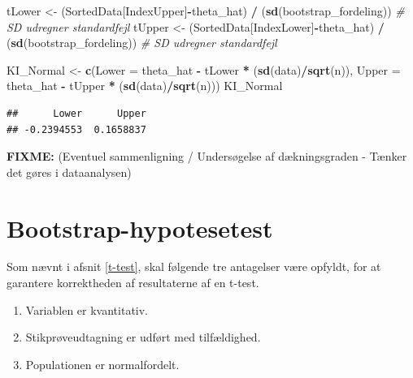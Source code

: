 \documentclass[
]{book}
\newenvironment{Shaded}{\begin{snugshade}}{\end{snugshade}}
\newcommand{\CommentTok}[1]{\textcolor[rgb]{0.56,0.35,0.01}{\textit{#1}}}
\newcommand{\DataTypeTok}[1]{\textcolor[rgb]{0.13,0.29,0.53}{#1}}
\newcommand{\KeywordTok}[1]{\textcolor[rgb]{0.13,0.29,0.53}{\textbf{#1}}}
\newcommand{\NormalTok}[1]{#1}
\newcommand{\OperatorTok}[1]{\textcolor[rgb]{0.81,0.36,0.00}{\textbf{#1}}}
\newcommand{\StringTok}[1]{\textcolor[rgb]{0.31,0.60,0.02}{#1}}
\providecommand{\tightlist}{%
  \setlength{\itemsep}{0pt}\setlength{\parskip}{0pt}}
\theoremstyle{definition}
\theoremstyle{definition}
\theoremstyle{definition}
\theoremstyle{remark}
\begin{document}
\begin{Shaded}
\begin{Highlighting}[]
\NormalTok{tLower <-}\StringTok{ }\NormalTok{(SortedData[IndexUpper]}\OperatorTok{-}\NormalTok{theta_hat) }\OperatorTok{/}
\StringTok{  }\NormalTok{(}\KeywordTok{sd}\NormalTok{(bootstrap_fordeling)) }\CommentTok{# SD udregner standardfejl}
\NormalTok{tUpper <-}\StringTok{ }\NormalTok{(SortedData[IndexLower]}\OperatorTok{-}\NormalTok{theta_hat) }\OperatorTok{/}
\StringTok{  }\NormalTok{(}\KeywordTok{sd}\NormalTok{(bootstrap_fordeling)) }\CommentTok{# SD udregner standardfejl}

\NormalTok{KI_Normal <-}\StringTok{ }\KeywordTok{c}\NormalTok{(}\DataTypeTok{Lower =}\NormalTok{ theta_hat }\OperatorTok{-}\StringTok{ }\NormalTok{tLower }\OperatorTok{*}\StringTok{ }\NormalTok{(}\KeywordTok{sd}\NormalTok{(data)}\OperatorTok{/}\KeywordTok{sqrt}\NormalTok{(n)),}
               \DataTypeTok{Upper =}\NormalTok{ theta_hat }\OperatorTok{-}\StringTok{ }\NormalTok{tUpper }\OperatorTok{*}\StringTok{ }\NormalTok{(}\KeywordTok{sd}\NormalTok{(data)}\OperatorTok{/}\KeywordTok{sqrt}\NormalTok{(n)))}
\NormalTok{KI_Normal}
\end{Highlighting}
\end{Shaded}

\begin{verbatim}
##      Lower      Upper 
## -0.2394553  0.1658837
\end{verbatim}

\textbf{FIXME:} (Eventuel sammenligning / Undersøgelse af dækningsgraden - Tænker det gøres i dataanalysen)

\hypertarget{bootstrap-hypotesetest}{%
\section{Bootstrap-hypotesetest}\label{bootstrap-hypotesetest}}

Som nævnt i afsnit \ref{t-test}, skal følgende tre antagelser være opfyldt, for at garantere korrektheden af resultaterne af en t-test.

\begin{enumerate}
\def\labelenumi{\arabic{enumi}.}
\tightlist
\item
  Variablen er kvantitativ.
\item
  Stikprøveudtagning er udført med tilfældighed.
\item
  Populationen er normalfordelt.
\end{enumerate}
\end{document}
